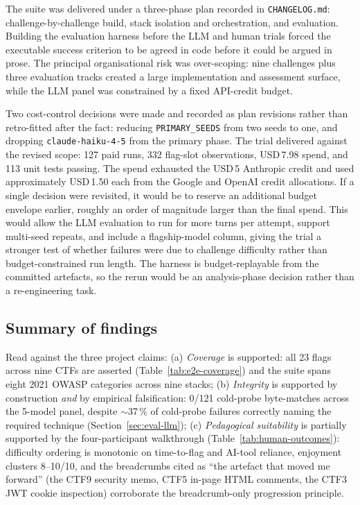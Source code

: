 The suite was delivered under a three-phase plan recorded in
\texttt{CHANGELOG.md}: challenge-by-challenge build, stack
isolation and orchestration, and evaluation. Building the
evaluation harness before the LLM and human trials forced the
executable success criterion to be agreed in code before it
could be argued in prose. The principal organisational risk
was over-scoping: nine challenges plus three evaluation
tracks created a large implementation and assessment surface,
while the LLM panel was constrained by a fixed API-credit
budget.

Two cost-control decisions were made and recorded as plan
revisions rather than retro-fitted after the fact: reducing
\texttt{PRIMARY\_SEEDS} from two seeds to one, and dropping
\texttt{claude-haiku-4-5} from the primary phase. The trial
delivered against the revised scope: 127 paid runs, 332
flag-slot observations, USD\,7.98 spend, and 113 unit tests
passing. The spend exhausted the USD\,5 Anthropic credit and
used approximately USD\,1.50 each from the Google and OpenAI
credit allocations. If a single decision were revisited, it
would be to reserve an additional budget envelope earlier,
roughly an order of magnitude larger than the final spend.
This would allow the LLM evaluation to run for more turns per
attempt, support multi-seed repeats, and include a flagship-model
column, giving the trial a stronger test of whether failures
were due to challenge difficulty rather than budget-constrained
run length. The harness is budget-replayable from the committed
artefacts, so the rerun would be an analysis-phase decision
rather than a re-engineering task.

\subsection{Summary of findings}
\label{sec:eval-summary}

Read against the three project claims:
(a) \emph{Coverage} is supported: all 23 flags across nine
CTFs are asserted (Table~\ref{tab:e2e-coverage}) and the
suite spans eight 2021 OWASP categories across nine stacks;
(b) \emph{Integrity} is supported by construction \emph{and}
by empirical falsification: 0/121 cold-probe byte-matches
across the 5-model panel, despite $\sim$37\,\% of
cold-probe failures correctly naming the required technique
(Section~\ref{sec:eval-llm});
(c) \emph{Pedagogical suitability} is partially supported by
the four-participant walkthrough
(Table~\ref{tab:human-outcomes}): difficulty ordering is
monotonic on time-to-flag and AI-tool reliance, enjoyment
clusters 8--10/10, and the breadcrumbs cited as ``the
artefact that moved me forward'' (the CTF9 security memo,
CTF5 in-page HTML comments, the CTF3 JWT cookie inspection)
corroborate the
breadcrumb-only progression principle.

